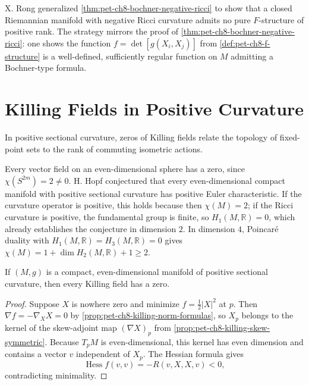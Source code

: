\begin{remark}
  \label{rem:pet-ch8-rong-f-structure}
  X. Rong generalized \cref{thm:pet-ch8-bochner-negative-ricci} to show that a
  closed Riemannian manifold with negative Ricci curvature admits no pure
  $F$-structure of positive rank. The strategy mirrors the proof of
  \cref{thm:pet-ch8-bochner-negative-ricci}: one shows the function
  $f=\det[g(X_i,X_j)]$ from \cref{def:pet-ch8-f-structure} is a well-defined,
  sufficiently regular function on $M$ admitting a Bochner-type formula.
\end{remark}

\section{Killing Fields in Positive Curvature}

In positive sectional curvature, zeros of Killing fields relate the topology
of fixed-point sets to the rank of commuting isometric actions.

\begin{remark}
  \label{rem:pet-ch8-hopf-conjecture-low-dimensions}
  Every vector field on an even-dimensional sphere has a zero, since
  $\chi(S^{2m})=2\ne0$. H. Hopf conjectured that every even-dimensional compact
  manifold with positive sectional curvature has positive Euler characteristic.
  If the curvature operator is positive, this holds because then
  $\chi(M)=2$; if the Ricci curvature is positive, the fundamental group is
  finite, so $H_1(M,\mathbb{R})=0$, which already establishes the conjecture in
  dimension $2$. In dimension $4$, Poincar\'e duality with $H_1(M,\mathbb{R})=H_3(M,\mathbb{R})=0$
  gives $\chi(M)=1+\dim H_2(M,\mathbb{R})+1\ge2$.
\end{remark}

\begin{theorem}
  \label{thm:pet-ch8-berger-killing-field-zero}
  If $(M,g)$ is a compact, even-dimensional manifold of positive sectional
  curvature, then every Killing field has a zero.
\end{theorem}
\begin{proof}
  \sketch
  Suppose \(X\) is nowhere zero and minimize \(f=\tfrac12|X|^2\) at \(p\).
  Then \(\nabla f=-\nabla_XX=0\) by
  \cref{prop:pet-ch8-killing-norm-formulas}, so \(X_p\) belongs to the kernel of
  the skew-adjoint map \((\nabla X)_p\) from
  \cref{prop:pet-ch8-killing-skew-symmetric}. Because \(T_pM\) is
  even-dimensional, this kernel has even dimension and contains a vector
  \(v\) independent of \(X_p\). The Hessian formula gives
  \[
    \operatorname{Hess}f(v,v)=-R(v,X,X,v)<0,
  \]
  contradicting minimality.
\end{proof}

